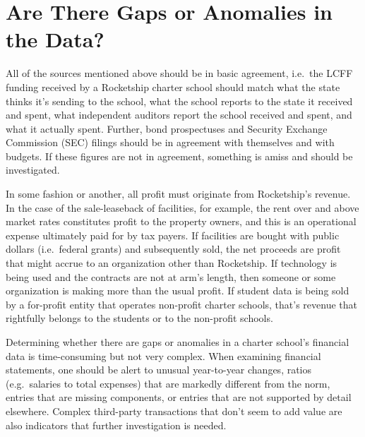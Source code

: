 \section{Are There Gaps or Anomalies in the Data?}\label{sec:gaps-anomalies}\indent

All of the sources mentioned above should be in basic agreement, i.e.~the LCFF funding received by a Rocketship charter school should match what the state thinks it's sending to the school, what the school reports to the state it received and spent, what independent auditors report the school received and spent, and what it actually spent. Further, bond prospectuses and Security Exchange Commission (SEC) filings should be in agreement with themselves and with budgets. If these figures are not in agreement, something is amiss and should be investigated.

In some fashion or another, all profit must originate from Rocketship's revenue. In the case of the sale-leaseback of facilities, for example, the rent over and above market rates constitutes profit to the property owners, and this is an operational expense ultimately paid for by tax payers. If facilities are bought with public dollars (i.e.~federal grants) and subsequently sold, the net proceeds are profit that might accrue to an organization other than Rocketship. If technology is being used and the contracts are not at arm's length, then someone or some organization is making more than the usual profit. If student data is being sold by a for-profit entity that operates non-profit charter schools, that's revenue that rightfully belongs to the students or to the non-profit schools. 

Determining whether there are gaps or anomalies in a charter school's financial data is time-consuming but not very complex. When examining financial statements, one should be alert to unusual year-to-year changes, ratios (e.g. salaries to total expenses) that are markedly different from the norm, entries that are missing components, or entries that are not supported by detail elsewhere. Complex third-party transactions that don't seem to add value are also indicators that further investigation is needed.

